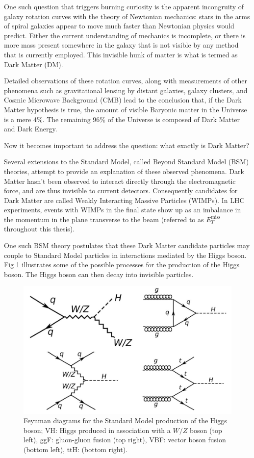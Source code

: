 \documentclass[12pt,a4paper,openright,twoside]{report}
\newcommand{\met}{$E_T^{\mathrm{miss}}$ }
\begin{document}
One such question that triggers burning curiosity is the apparent incongruity of galaxy rotation curves with the theory of Newtonian mechanics: stars in the arms of spiral galaxies appear to move much faster than Newtonian physics would predict. Either the current understanding of mechanics is incomplete, or there is more mass present somewhere in the galaxy that is not visible by any method that is currently employed. This invisible hunk of matter is what is termed as Dark Matter (DM).

Detailed observations of these rotation curves, along with measurements of other phenomena such as gravitational lensing by distant galaxies, galaxy clusters, and Cosmic Microwave Background (CMB) lead to the conclusion that, if the Dark Matter hypothesis is true, the amount of visible Baryonic matter in the Universe is a mere 4\%. The remaining 96\% of the Universe is composed of Dark Matter and Dark Energy.

Now it becomes important to address the question: what exactly is Dark Matter? 

Several extensions to the Standard Model, called Beyond Standard Model (BSM) theories, attempt to provide an explanation of these observed phenomena. Dark Matter hasn't been observed to interact directly through the electromagnetic force, and are thus invisible to current detectors. Consequently candidates for Dark Matter are called Weakly Interacting Massive Particles (WIMPs). In LHC experiments, events with WIMPs in the final state show up as an imbalance in the momentum in the plane transverse to the beam (referred to as \met throughout this thesis).

One such BSM theory postulates that these Dark Matter candidate particles may couple to Standard Model particles in interactions mediated by the Higgs boson. Fig \ref{fig:higgs} illustrates some of the possible processes for the production of the Higgs boson. The Higgs boson can then decay into invisible particles.

\begin{figure}[H]
\centering
\includegraphics[width=0.5\linewidth]{higgs_production.png}
\caption{Feynman diagrams for the Standard Model production of the Higgs boson; VH: Higgs produced in association with a $W/Z$ boson (top left), ggF: gluon-gluon fusion (top right), VBF: vector boson fusion (bottom left), ttH: (bottom right).}
\label{fig:higgs}
\end{figure}
\end{document}
